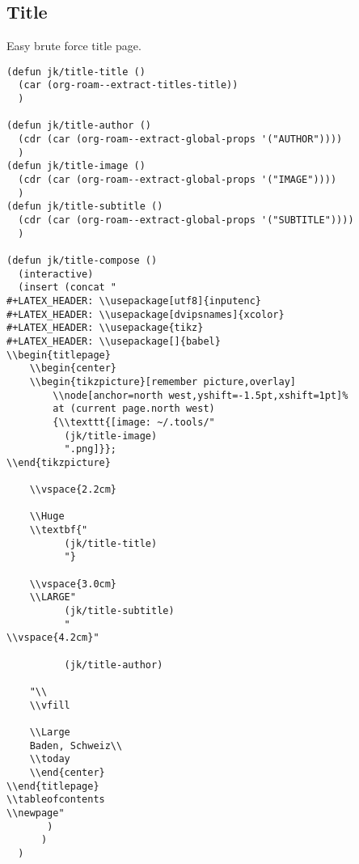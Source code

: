 \documentclass[11pt]{article}
\begin{document}
\subsection{Title}
\label{sec:org1d9cbe4}
Easy brute force title page.
\begin{verbatim}
(defun jk/title-title ()
  (car (org-roam--extract-titles-title))
  )

(defun jk/title-author ()
  (cdr (car (org-roam--extract-global-props '("AUTHOR"))))
  )
(defun jk/title-image ()
  (cdr (car (org-roam--extract-global-props '("IMAGE"))))
  )
(defun jk/title-subtitle ()
  (cdr (car (org-roam--extract-global-props '("SUBTITLE"))))
  )

(defun jk/title-compose ()
  (interactive)
  (insert (concat "
#+LATEX_HEADER: \\usepackage[utf8]{inputenc}
#+LATEX_HEADER: \\usepackage[dvipsnames]{xcolor}
#+LATEX_HEADER: \\usepackage{tikz}
#+LATEX_HEADER: \\usepackage[]{babel}
\\begin{titlepage}
    \\begin{center}
	\\begin{tikzpicture}[remember picture,overlay]
	    \\node[anchor=north west,yshift=-1.5pt,xshift=1pt]%
	    at (current page.north west)
	    {\\texttt{[image: ~/.tools/"
		  (jk/title-image)
		  ".png]}};
\\end{tikzpicture}

	\\vspace{2.2cm}

	\\Huge
	\\textbf{"
		  (jk/title-title)
		  "}

	\\vspace{3.0cm}
	\\LARGE"
		  (jk/title-subtitle)
		  "
\\vspace{4.2cm}"

		  (jk/title-author)

	"\\
	\\vfill

	\\Large
	Baden, Schweiz\\
	\\today
    \\end{center}
\\end{titlepage}
\\tableofcontents
\\newpage"
	   )
	  )
  )
\end{verbatim}
\end{document}
